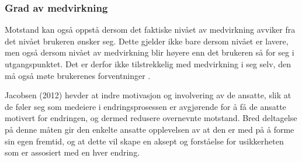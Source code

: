 \subsubsection{Grad av medvirkning}
Motstand kan også oppstå dersom det faktiske nivået av medvirkning avviker fra det nivået brukeren ønsker seg. Dette gjelder ikke bare dersom nivået er lavere, men også dersom nivået av medvirkning blir høyere enn det brukeren så for seg i utgangspunktet. Det er derfor ikke tilstrekkelig med medvirkning i seg selv, den må også møte brukerenes forventninger \cite{Cavaye95}.

\noindent
Jacobsen (2012) hevder at indre motivasjon og involvering av de ansatte, slik at de føler seg som medeiere i endringsprosessen er avgjørende for å få de ansatte motivert for endringen, og dermed redusere overnevnte motstand. Bred deltagelse på denne måten gir den enkelte ansatte opplevelsen av at den er med på å forme sin egen fremtid, og at dette vil skape en aksept og forståelse for usikkerheten som er assosiert med en hver endring.